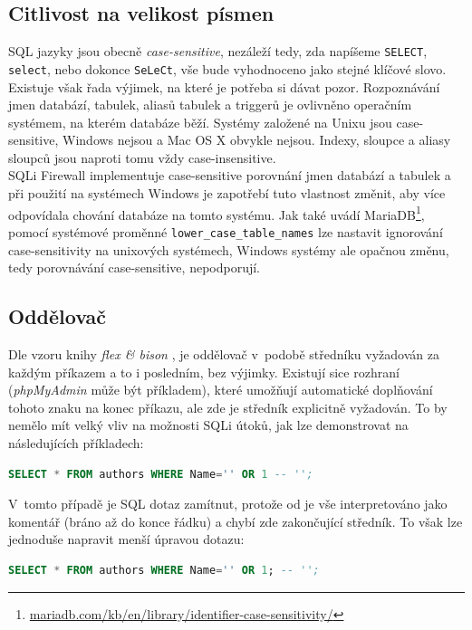 \subsection{Citlivost na velikost písmen} \label{subsec:6:casesensitive}
SQL jazyky jsou obecně \textit{case-sensitive}, nezáleží tedy, zda napíšeme \texttt{SELECT}, \texttt{select}, nebo
dokonce \texttt{SeLeCt}, vše bude vyhodnoceno jako stejné klíčové slovo. Existuje však řada výjimek, na které je
potřeba si dávat pozor.
Rozpoznávání jmen databází, tabulek, aliasů tabulek a triggerů je ovlivněno operačním systémem, na kterém
databáze běží. Systémy založené na Unixu jsou case-sensitive, Windows nejsou a Mac OS X obvykle nejsou.
Indexy, sloupce a aliasy sloupců jsou naproti tomu vždy case-insensitive. \\

SQLi Firewall implementuje case-sensitive porovnání jmen databází a tabulek a při použití na systémech Windows je zapotřebí
tuto vlastnost změnit, aby více odpovídala chování databáze na tomto systému.
Jak také uvádí MariaDB\footnote{\url{mariadb.com/kb/en/library/identifier-case-sensitivity/}}, pomocí 
systémové proměnné \texttt{lower\_case\_table\_names} lze nastavit ignorování case-sensitivity na unixových systémech,
Windows systémy ale opačnou změnu, tedy porovnávání case-sensitive, nepodporují. 

\subsection{Oddělovač} \label{subsec:6:delimiter}
Dle vzoru knihy \textit{flex \& bison} \cite{levine2009}, je oddělovač v~podobě středníku vyžadován za každým příkazem a to i posledním, bez výjimky. 
Existují sice rozhraní (\textit{phpMyAdmin} může být příkladem), které umožňují automatické doplňování tohoto znaku na konec příkazu, 
ale zde je středník explicitně vyžadován. To by nemělo mít velký vliv na možnosti SQLi útoků, jak lze demonstrovat na následujících příkladech:
\begin{lstlisting}[language=sql]
SELECT * FROM authors WHERE Name='' OR 1 -- '';
\end{lstlisting}

V~tomto případě je SQL dotaz zamítnut, protože od \uv{-{}-} je vše interpretováno jako komentář (bráno až do konce řádku) a chybí zde zakončující středník. 
To však lze jednoduše napravit menší úpravou dotazu:
\begin{lstlisting}[language=sql]
SELECT * FROM authors WHERE Name='' OR 1; -- '';
\end{lstlisting}

